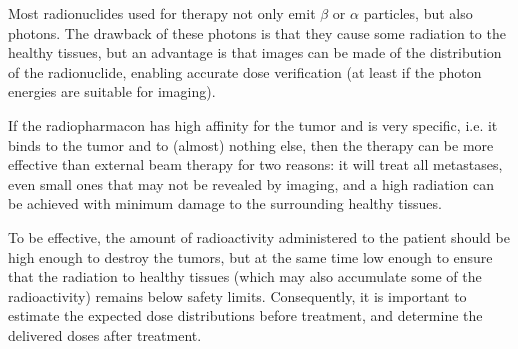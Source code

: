 \documentclass[11pt,oneside]{article}
\begin{document}
Most radionuclides used for therapy not only emit $\beta$ or $\alpha$
particles, but also photons. The drawback of these photons is that
they cause some radiation to the healthy tissues, but an advantage is
that images can be made of the distribution of the radionuclide,
enabling accurate dose verification (at least if the photon energies
are suitable for imaging).

If the radiopharmacon has high affinity for the tumor and is very
specific, i.e. it binds to the tumor and to (almost) nothing else,
then the therapy can be more effective than external beam therapy for
two reasons: it will treat all metastases, even small ones that may
not be revealed by imaging, and a high radiation can be achieved with
minimum damage to the surrounding healthy tissues.

To be effective, the amount of radioactivity administered to the
patient should be high enough to destroy the tumors, but at the same
time low enough to ensure that the radiation to healthy tissues (which
may also accumulate some of the radioactivity) remains below safety
limits. Consequently, it is important to estimate the expected dose
distributions before treatment, and determine the delivered doses
after treatment.
\end{document}
